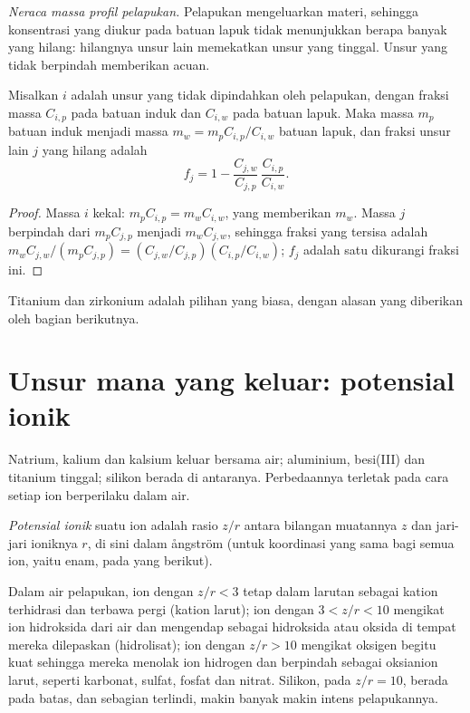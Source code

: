 \emph{Neraca massa profil pelapukan.} Pelapukan mengeluarkan materi, sehingga konsentrasi yang diukur pada batuan lapuk tidak menunjukkan berapa banyak yang hilang: hilangnya unsur lain memekatkan unsur yang tinggal. Unsur yang tidak berpindah memberikan acuan.

\begin{proposition}\label{prop:b1:weathering-clays:immobile}
Misalkan $i$ adalah unsur yang tidak dipindahkan oleh pelapukan, dengan fraksi massa $C_{i,p}$ pada batuan induk dan $C_{i,w}$ pada batuan lapuk. Maka massa $m_p$ batuan induk menjadi massa $m_w = m_p C_{i,p}/C_{i,w}$ batuan lapuk, dan fraksi unsur lain $j$ yang hilang adalah
\[
  f_j = 1 - \frac{C_{j,w}}{C_{j,p}}\,\frac{C_{i,p}}{C_{i,w}} .
\]
\end{proposition}

\begin{proof}
Massa $i$ kekal: $m_p C_{i,p} = m_w C_{i,w}$, yang memberikan $m_w$.
Massa $j$ berpindah dari $m_p C_{j,p}$ menjadi $m_w C_{j,w}$, sehingga fraksi yang tersisa adalah
$m_w C_{j,w}/(m_p C_{j,p}) = (C_{j,w}/C_{j,p})(C_{i,p}/C_{i,w})$; $f_j$ adalah satu dikurangi fraksi ini.
\end{proof}

Titanium dan zirkonium adalah pilihan yang biasa, dengan alasan yang diberikan oleh bagian berikutnya.

\section{Unsur mana yang keluar: potensial ionik}\label{sec:b1:weathering-clays:ionic}

Natrium, kalium dan kalsium keluar bersama air; aluminium, besi(III) dan titanium tinggal; silikon berada di antaranya. Perbedaannya terletak pada cara setiap ion berperilaku dalam air.

\begin{definition}\label{def:b1:weathering-clays:ionic-potential}
\emph{Potensial ionik} suatu ion adalah rasio $z/r$ antara bilangan muatannya $z$ dan jari-jari ioniknya $r$, di sini dalam ångström (untuk koordinasi yang sama bagi semua ion, yaitu enam, pada yang berikut).
\end{definition}

\begin{proposition}\label{prop:b1:weathering-clays:fields}
Dalam air pelapukan, ion dengan $z/r < 3$ tetap dalam larutan sebagai kation terhidrasi dan terbawa pergi (kation larut); ion dengan $3 < z/r < 10$ mengikat ion hidroksida dari air dan mengendap sebagai hidroksida atau oksida di tempat mereka dilepaskan (hidrolisat); ion dengan $z/r > 10$ mengikat oksigen begitu kuat sehingga mereka menolak ion hidrogen dan berpindah sebagai oksianion larut, seperti karbonat, sulfat, fosfat dan nitrat. Silikon, pada $z/r = 10$, berada pada batas, dan sebagian terlindi, makin banyak makin intens pelapukannya.
\end{proposition}
\admitted

